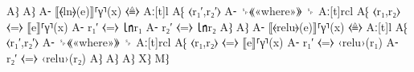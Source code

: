 \documentclass{article}
\begin{document}
                                              A⁆
                              A⁆
   A⁃ ⟦⦑ln⦒(e)⟧⸢γ⸣(x)         ⧼≜⧽ Aː[t]l
                              A⁅ ⟨r₁′,r₂′⟩
                              A⁃ ␠⟪«where»⟫ ␠ Aː[t]rcl
                                              A⁅ ⟨r₁,r₂⟩ ⧼=⧽ ⟦e⟧⸢γ⸣(x)
                                              A⁃ r₁′ ⧼=⧽ ㏑r₁
                                              A⁃ r₂′ ⧼=⧽ ㏑r₂
                                              A⁆
                            A⁆
   A⁃ ⟦⦑relu⦒(e)⟧⸢γ⸣(x) ⧼≜⧽ Aː[t]l
                            A⁅ ⟨r₁′,r₂′⟩
                            A⁃ ␠⟪«where»⟫ ␠ Aː[t]rcl
                                            A⁅ ⟨r₁,r₂⟩ ⧼=⧽ ⟦e⟧⸢γ⸣(x)
                                            A⁃ r₁′ ⧼=⧽ ‹relu›(r₁)
                                            A⁃ r₂′ ⧼=⧽ ‹relu›(r₂)
                                            A⁆
                            A⁆
   A⁆
X⁆
M⁆




\end{document}
